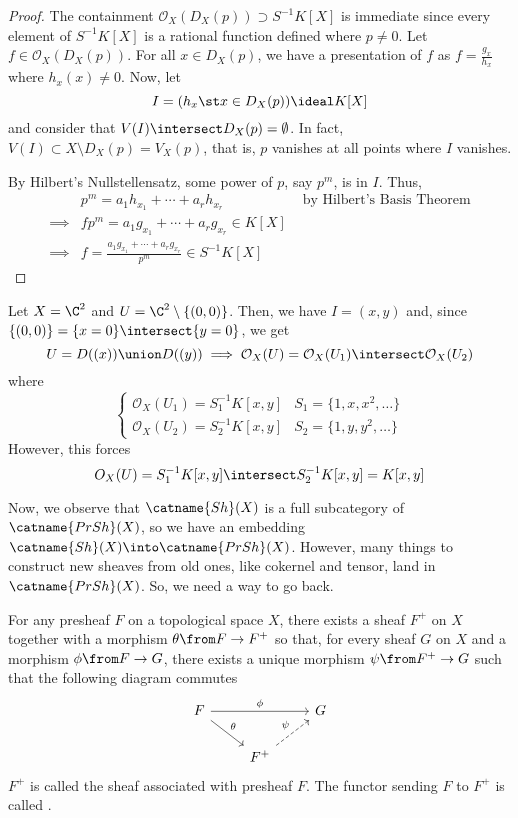 \documentclass[11pt,leqno,oneside]{amsbook}
\renewcommand{\F}{F} %
\newcommand{\G}{G}
\renewcommand{\O}{\mathcal{O}}
\numberwithin{thm}{section}
\begin{document}
\begin{proof}
  The containment \(\O_X(D_X(p)) \supset S^{-1}K[X]\) is immediate
  since every element of \(S^{-1}K[X]\) is a rational function defined
  where \(p \neq 0\). Let \(f \in \O_X(D_X(p))\). For all \(x \in
  D_X(p)\), we have a presentation of \(f\) as \(f = \frac{g_x}{h_x}\)
  where \(h_x(x) \neq 0\). Now, let \[
    I = (h_x \st x \in D_X(p)) \ideal K[X]
  \]
  and consider that \(V(I) \intersect D_X(p) = \emptyset\). In fact,
  \(V(I) \subset X \setminus D_X(p) = V_X(p)\), that is, \(p\)
  vanishes at all points where \(I\) vanishes.

  By Hilbert's Nullstellensatz, some power of \(p\), say \(p^m\), is
  in \(I\). Thus,
  \begin{align*}
    & p^m = a_1 h_{x_1} + \cdots + a_r h_{x_r} & \text{ by Hilbert's
                                                 Basis Theorem} \\
    \implies & fp^m = a_1 g_{x_1} + \cdots + a_r g_{x_r} \in K[X] \\
    \implies & f = \frac{a_1 g_{x_1} + \cdots + a_r g_{x_r}}{p^m} \in S^{-1}K[X]
  \end{align*}
\end{proof}
\begin{example}
  Let \(X = \C^2\) and \(U = \C^2 \setminus \{(0,0)\}\). Then, we have
  \(I = (x,y)\) and, since \(\{(0,0)\} = \{x=0\} \intersect \{y=0\}\),
  we get \[
    U = D((x)) \union D((y)) \implies \O_X(U) = \O_X(U_1) \intersect \O_X(U_2)
  \]
  where \[
    \begin{cases}
      \O_X(U_1) = S_1^{-1}K[x,y] & S_1 = \{1,x,x^2,\ldots\} \\
      \O_X(U_2) = S_2^{-1}K[x,y] & S_2 = \{1,y,y^2,\ldots\}
    \end{cases}
  \]
  However, this forces \[
    O_X(U) = S_1^{-1}K[x,y] \intersect S_2^{-1}K[x,y] = K[x,y]
  \]
\end{example}
Now, we observe that \(\catname{Sh}(X)\) is a full subcategory of
\(\catname{PrSh}(X)\), so we have an embedding \(\catname{Sh}(X) \into
\catname{PrSh}(X)\). However, many things to construct new sheaves
from old ones, like cokernel and tensor, land in
\(\catname{PrSh}(X)\). So, we need a way to go back.
\begin{thm}
  For any presheaf \(\F\) on a topological space \(X\), there exists a
  sheaf \(\F^+\) on \(X\) together with a morphism \(\theta \from \F
  \to \F^+\) so that, for every sheaf \(\G\) on \(X\) and a morphism
  \(\phi \from \F \to G\), there exists a unique morphism \(\psi \from
  \F^+ \to G\) such that the following diagram commutes \[
    \begin{tikzcd}
      \F \ar[rd, "\theta"] \ar[rr,"\phi"] & & \G \\
      & \F^+ \ar[ru, dashed, "\psi"]
    \end{tikzcd}
  \]
  \(\F^+\) is called the sheaf associated with presheaf \(\F\). The
  functor sending \(\F\) to \(\F^+\) is called .
\end{thm}
\end{document}
